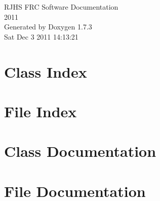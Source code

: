 \documentclass[letterpaper]{book}
\begin{document}
\hypersetup{pageanchor=false}
\begin{titlepage}
\vspace*{7cm}
\begin{center}
{\Large RJHS FRC Software Documentation \\[1ex]\large 2011 }\\
\vspace*{1cm}
{\large Generated by Doxygen 1.7.3}\\
\vspace*{0.5cm}
{\small Sat Dec 3 2011 14:13:21}\\
\end{center}
\end{titlepage}
\clearemptydoublepage
{}
\tableofcontents
\clearemptydoublepage
{}
\hypersetup{pageanchor=true}
\chapter{Class Index}

\chapter{File Index}

\chapter{Class Documentation}






\chapter{File Documentation}














\printindex
\end{document}
